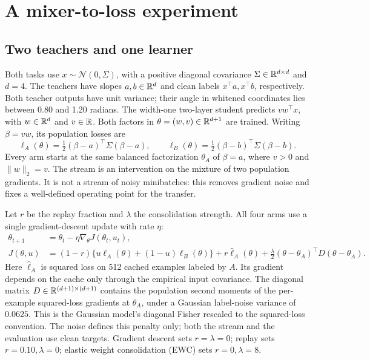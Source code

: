 \section{A mixer-to-loss experiment}
\label{sec:method}

\subsection{Two teachers and one learner}

Both tasks use \(x\sim\mathcal N(0,\Sigma)\), with a positive diagonal covariance \(\Sigma\in\mathbb{R}^{d\times d}\) and \(d=4\). The teachers have slopes \(a,b\in\mathbb{R}^d\) and clean labels \(x^\top a,x^\top b\), respectively. Both teacher outputs have unit variance; their angle in whitened coordinates lies between 0.80 and 1.20 radians. The width-one two-layer student predicts \(v w^\top x\), with \(w\in\mathbb{R}^d\) and \(v\in\mathbb{R}\). Both factors in \(\theta=(w,v)\in\mathbb{R}^{d+1}\) are trained. Writing \(\beta=vw\), its population losses are
\begin{equation}
  \ell_A(\theta)=\tfrac12(\beta-a)^\top\Sigma(\beta-a),\qquad
  \ell_B(\theta)=\tfrac12(\beta-b)^\top\Sigma(\beta-b).
  \label{eq:loss}
\end{equation}
Every arm starts at the same balanced factorization \(\theta_A\) of \(\beta=a\), where \(v>0\) and \(\|w\|_2=v\). The stream is an intervention on the mixture of two population gradients. It is not a stream of noisy minibatches: this removes gradient noise and fixes a well-defined operating point for the transfer.

Let \(r\) be the replay fraction and \(\lambda\) the consolidation strength. All four arms use a single gradient-descent update with rate \(\eta\):
\begin{align}
  \theta_{t+1}&=\theta_t-\eta\nabla_\theta J(\theta_t,u_t), \label{eq:update}\\
  J(\theta,u)&=(1-r)\{u\ell_A(\theta)+(1-u)\ell_B(\theta)\}
    +r\widehat\ell_A(\theta)
    +\tfrac{\lambda}{2}(\theta-\theta_A)^\top D(\theta-\theta_A). \label{eq:objective}
\end{align}
Here \(\widehat\ell_A\) is squared loss on 512 cached examples labeled by \(A\). Its gradient depends on the cache only through the empirical input covariance. The diagonal matrix \(D\in\mathbb{R}^{(d+1)\times(d+1)}\) contains the population second moments of the per-example squared-loss gradients at \(\theta_A\), under a Gaussian label-noise variance of \(0.0625\). This is the Gaussian model's diagonal Fisher rescaled to the squared-loss convention. The noise defines this penalty only; both the stream and the evaluation use clean targets. Gradient descent sets \(r=\lambda=0\); replay sets \(r=0.10,\lambda=0\); elastic weight consolidation (EWC) sets \(r=0,\lambda=8\).

